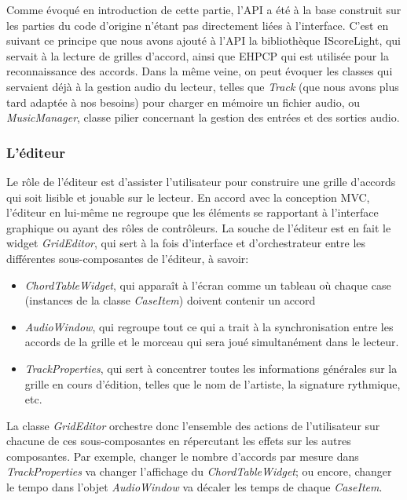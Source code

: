 \documentclass[a4paper,11pt]{article}
\begin{document}
Comme évoqué en introduction de cette partie, l'API a été à la base construit sur les parties du code d'origine n'étant pas directement liées à l'interface. C'est en suivant ce principe que nous avons ajouté à l'API la bibliothèque IScoreLight, qui servait à la lecture de grilles d'accord, ainsi que EHPCP qui est utilisée pour la reconnaissance des accords. Dans la même veine, on peut évoquer les classes qui servaient déjà à la gestion audio du lecteur, telles que \textit{Track} (que nous avons plus tard adaptée à nos besoins) pour charger en mémoire un fichier audio, ou \textit{MusicManager}, classe pilier concernant la gestion des entrées et des sorties audio.

\subsubsection{L'éditeur}

Le rôle de l'éditeur est d'assister l'utilisateur pour construire une grille d'accords qui soit lisible et jouable sur le lecteur. En accord avec la conception MVC, l'éditeur en lui-même ne regroupe que les éléments se rapportant à l'interface graphique ou ayant des rôles de contrôleurs. La souche de l'éditeur est en fait le widget \textit{GridEditor}, qui sert à la fois d'interface et d'orchestrateur entre les différentes sous-composantes de l'éditeur, à savoir:
\begin{itemize}
 \item \textit{ChordTableWidget}, qui apparaît à l'écran comme un tableau où chaque case (instances de la classe \textit{CaseItem}) doivent contenir un accord
 \item \textit{AudioWindow}, qui regroupe tout ce qui a trait à la synchronisation entre les accords de la grille et le morceau qui sera joué simultanément dans le lecteur.
 \item \textit{TrackProperties}, qui sert à concentrer toutes les informations générales sur la grille en cours d'édition, telles que le nom de l'artiste, la signature rythmique, etc.
\end{itemize}

La classe \textit{GridEditor} orchestre donc l'ensemble des actions de l'utilisateur sur chacune de ces sous-composantes en répercutant les effets sur les autres composantes. Par exemple, changer le nombre d'accords par mesure dans \textit{TrackProperties} va changer l'affichage du \textit{ChordTableWidget}; ou encore, changer le tempo dans l'objet \textit{AudioWindow} va décaler les temps de chaque \textit{CaseItem}.
\end{document}
